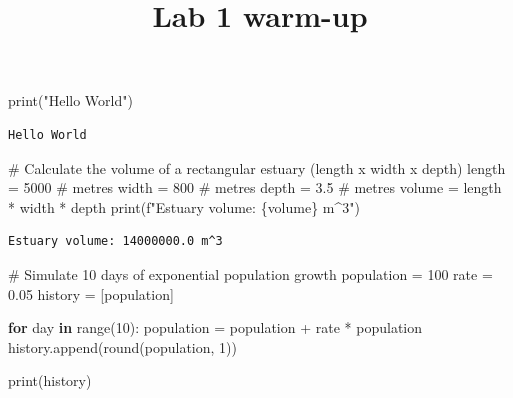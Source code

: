 \documentclass[
  letterpaper,
  DIV=11,
  numbers=noendperiod]{scrartcl}
\title{Lab 1 warm-up}
\author{}
\date{}
\newenvironment{Shaded}{\begin{snugshade}}{\end{snugshade}}
\newcommand{\BuiltInTok}[1]{\textcolor[rgb]{0.00,0.23,0.31}{#1}}
\newcommand{\CommentTok}[1]{\textcolor[rgb]{0.37,0.37,0.37}{#1}}
\newcommand{\ControlFlowTok}[1]{\textcolor[rgb]{0.00,0.23,0.31}{\textbf{#1}}}
\newcommand{\DecValTok}[1]{\textcolor[rgb]{0.68,0.00,0.00}{#1}}
\newcommand{\FloatTok}[1]{\textcolor[rgb]{0.68,0.00,0.00}{#1}}
\newcommand{\KeywordTok}[1]{\textcolor[rgb]{0.00,0.23,0.31}{\textbf{#1}}}
\newcommand{\NormalTok}[1]{\textcolor[rgb]{0.00,0.23,0.31}{#1}}
\newcommand{\OperatorTok}[1]{\textcolor[rgb]{0.37,0.37,0.37}{#1}}
\newcommand{\SpecialCharTok}[1]{\textcolor[rgb]{0.37,0.37,0.37}{#1}}
\newcommand{\SpecialStringTok}[1]{\textcolor[rgb]{0.13,0.47,0.30}{#1}}
\newcommand{\StringTok}[1]{\textcolor[rgb]{0.13,0.47,0.30}{#1}}
\begin{document}
\maketitle


\begin{Shaded}
\begin{Highlighting}[]
\BuiltInTok{print}\NormalTok{(}\StringTok{"Hello World"}\NormalTok{)}
\end{Highlighting}
\end{Shaded}

\begin{verbatim}
Hello World
\end{verbatim}

\begin{Shaded}
\begin{Highlighting}[]
\CommentTok{\# Calculate the volume of a rectangular estuary (length x width x depth)}
\NormalTok{length }\OperatorTok{=} \DecValTok{5000}   \CommentTok{\# metres}
\NormalTok{width }\OperatorTok{=} \DecValTok{800}     \CommentTok{\# metres}
\NormalTok{depth }\OperatorTok{=} \FloatTok{3.5}     \CommentTok{\# metres}
\NormalTok{volume }\OperatorTok{=}\NormalTok{ length }\OperatorTok{*}\NormalTok{ width }\OperatorTok{*}\NormalTok{ depth}
\BuiltInTok{print}\NormalTok{(}\SpecialStringTok{f"Estuary volume: }\SpecialCharTok{\{}\NormalTok{volume}\SpecialCharTok{\}}\SpecialStringTok{ m\^{}3"}\NormalTok{)}
\end{Highlighting}
\end{Shaded}

\begin{verbatim}
Estuary volume: 14000000.0 m^3
\end{verbatim}

\begin{Shaded}
\begin{Highlighting}[]
\CommentTok{\# Simulate 10 days of exponential population growth}
\NormalTok{population }\OperatorTok{=} \DecValTok{100}
\NormalTok{rate }\OperatorTok{=} \FloatTok{0.05}
\NormalTok{history }\OperatorTok{=}\NormalTok{ [population]}

\ControlFlowTok{for}\NormalTok{ day }\KeywordTok{in} \BuiltInTok{range}\NormalTok{(}\DecValTok{10}\NormalTok{):}
\NormalTok{    population }\OperatorTok{=}\NormalTok{ population }\OperatorTok{+}\NormalTok{ rate }\OperatorTok{*}\NormalTok{ population}
\NormalTok{    history.append(}\BuiltInTok{round}\NormalTok{(population, }\DecValTok{1}\NormalTok{))}

\BuiltInTok{print}\NormalTok{(history)}
\end{Highlighting}
\end{Shaded}
\end{document}
